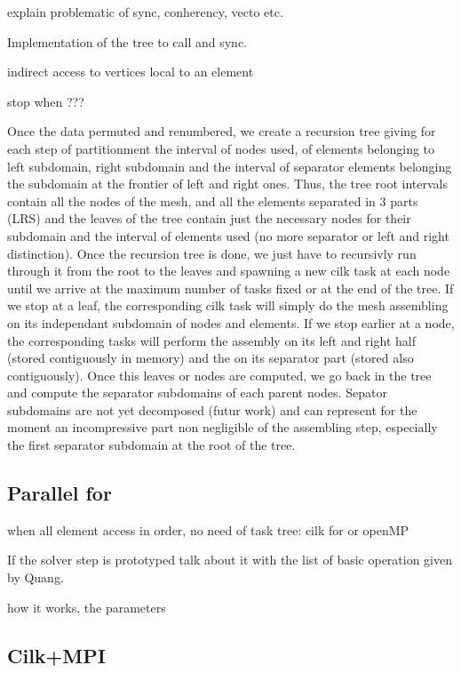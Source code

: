 \documentclass{IOS-Book-Article}
\begin{document}
explain problematic of sync, conherency, vecto etc.


Implementation of the tree to call and sync.

indirect access to vertices local to an element

stop when ???

Once the data permuted and renumbered, we create a recursion tree giving for each step of partitionment the interval of nodes used, of elements belonging to left subdomain,
right subdomain and the interval of separator elements belonging the subdomain at the frontier of left and right ones.
Thus, the tree root intervals contain all  the nodes of the mesh, and all the elements separated in 3 parts (LRS) and the leaves of the tree contain just the necessary nodes
for their subdomain and the interval of elements used (no more separator or left and right distinction).
Once the recursion tree is done, we just have to recursivly run through it from the root to the leaves and spawning a new cilk task at each node until we arrive at the maximum
number of tasks fixed or at the end of the tree. If we stop at a leaf, the corresponding cilk task will simply do the mesh assembling on its independant subdomain of nodes and
elements. If we stop earlier at a node, the corresponding tasks will perform the assembly on its left and right half (stored contiguously in memory) and the on its separator
part (stored also contiguously). Once this leaves or nodes are computed, we go back in the tree and compute the separator subdomains of each parent nodes.
Sepator subdomains are not yet decomposed (futur work) and can represent for the moment an incompressive part non negligible of the assembling step, especially the first
separator subdomain at the root of the tree.

\subsection{Parallel for}

when all element access in order, no need of task tree: cilk for or openMP

If the solver step is prototyped talk about it with the list of basic operation given by Quang.

how it works, the parameters


\subsection{Cilk+MPI}
\end{document}
